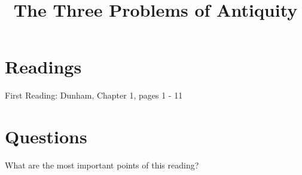 \documentclass{ximera}
\title{The Three Problems of Antiquity}
\begin{document}
\begin{abstract}
\end{abstract}
\maketitle






\section{Readings}

First Reading: Dunham, Chapter 1, pages 1 - 11






\section{Questions}




\begin{question}
What are the most important points of this reading?
\begin{freeResponse}
\end{freeResponse}
\end{question}
\end{document}
